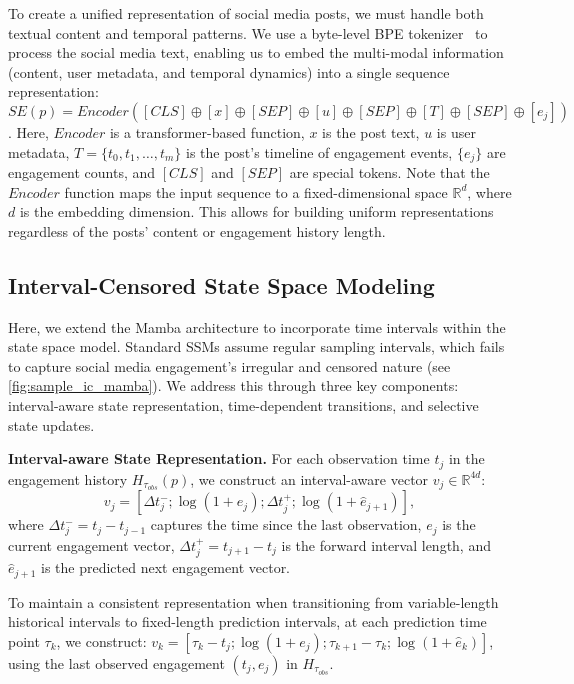 To create a unified representation of social media posts, we must handle both textual content and temporal patterns. 
We use a byte-level BPE tokenizer~\citep{black2022gptneoxb} to process the social media text, enabling us to embed the multi-modal information (content, user metadata, and temporal dynamics) into a single sequence representation:
$SE(p) = {Encoder}([CLS] \oplus [x] \oplus [SEP] \oplus [u] \oplus [SEP] \oplus [T] \oplus [SEP] \oplus [{e_j}])$.
Here, $Encoder$ is a transformer-based function, $x$ is the post text, $u$ is user metadata, $T = \{t_0, t_1, \dots, t_{m}\}$ is the post's timeline of engagement events, $\{e_j\}$ are engagement counts, and $[CLS]$ and $[SEP]$ are special tokens.
Note that the $Encoder$ function maps the input sequence to a fixed-dimensional space $\mathbb{R}^d$, where $d$ is the embedding dimension. 
This allows for building uniform representations regardless of the posts' content or engagement history length.

\subsection{Interval-Censored State Space Modeling}
\label{subsec:interval-censored-SSM}

Here, we extend the Mamba architecture to incorporate time intervals within the state space model. 
Standard SSMs assume regular sampling intervals, which fails to capture social media engagement's irregular and censored nature (see \cref{fig:sample_ic_mamba}). 
We address this through three key components: interval-aware state representation, time-dependent transitions, and selective state updates.

\noindent\textbf{Interval-aware State Representation.}
For each observation time $t_j$ in the engagement history $H_{\tau_{obs}}(p)$, we construct an interval-aware vector $v_j \in \mathbb{R}^{4d}$:
\begin{equation*}
        v_j = [\Delta t_j^-; \log(1 + e_j); \Delta t_j^+; \log(1 + \hat{e}_{j+1})],
\end{equation*}
where $\Delta t_{j}^- = t_{j} - t_{j-1}$ captures the time since the last observation, 
$e_{j}$ is the current engagement vector, 
$\Delta t_{j}^+ = t_{j+1} - t_{j}$ is the forward interval length, and 
$\hat{e}_{j+1}$ is the predicted next engagement vector.

To maintain a consistent representation when transitioning from variable-length historical intervals to fixed-length prediction intervals, at each prediction time point $\tau_k$, we construct: $v_k = [\tau_k - t_j; \log(1 + e_j); \tau_{k+1} - \tau_k; \log(1 + \hat{e}_k)]$,
using the last observed engagement $(t_{j}, e_{j})$ in $H_{\tau_{obs}}$.

